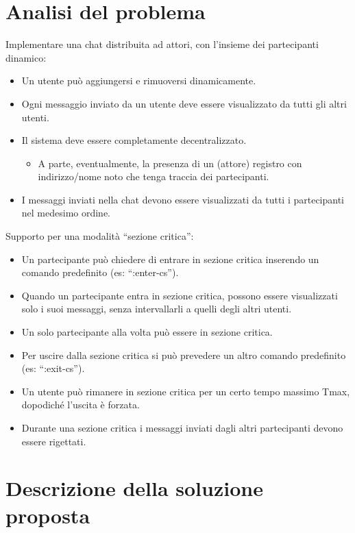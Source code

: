 \documentclass[a4paper]{report}
\begin{document}
\section{Analisi del problema}\label{analisi-del-problema-2}
Implementare una chat distribuita ad attori, con l'insieme dei partecipanti dinamico:
\begin{itemize}
    \item Un utente può aggiungersi e rimuoversi dinamicamente.
    \item Ogni messaggio inviato da un utente deve essere visualizzato da tutti gli altri utenti.
    \item Il sistema deve essere completamente decentralizzato.
        \begin{itemize}
            \item A parte, eventualmente, la presenza di un (attore) registro con indirizzo/nome noto che tenga traccia dei partecipanti.
        \end{itemize}
    \item I messaggi inviati nella chat devono essere visualizzati da tutti i partecipanti nel medesimo ordine.
\end{itemize}
Supporto per una modalità “sezione critica”:
\begin{itemize}
    \item Un partecipante può chiedere di entrare in sezione critica inserendo un comando predefinito (es: “:enter-cs”).
    \item Quando un partecipante entra in sezione critica, possono essere visualizzati solo i suoi messaggi, senza intervallarli a quelli degli altri utenti.
    \item Un solo partecipante alla volta può essere in sezione critica.
    \item Per uscire dalla sezione critica si può prevedere un altro comando predefinito (es: “:exit-cs”).
    \item Un utente può rimanere in sezione critica per un certo tempo massimo Tmax, dopodiché l’uscita è forzata.
    \item Durante una sezione critica i messaggi inviati dagli altri partecipanti devono essere rigettati.
\end{itemize}
\section{Descrizione della soluzione proposta}\label{soluzione-proposta-2}
\end{document}
